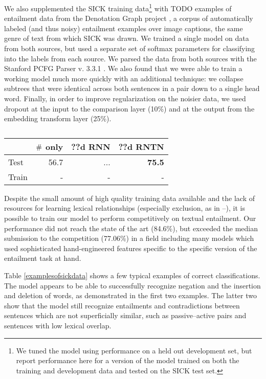 We also supplemented the SICK training data\footnote{We tuned the model using performance on a held out development set, but report performance here for a version of the model trained on both the training and development data and tested on the SICK test set.} with TODO examples of entailment data from the Denotation Graph project \cite{hodoshimage}, a corpus of automatically labeled (and thus noisy) entailment examples over image captions, the same genre of text from which SICK was drawn. We trained a single model on data from both sources, but used a separate set of softmax parameters for classifying into the labels from each source. We parsed the data from both sources with the Stanford PCFG Parser v. 3.3.1 \cite{klein2003accurate}. We also found that we were able to train a working model much more quickly with an additional technique: we collapse subtrees that were identical across both sentences in a pair down to a single head word. Finally, in order to improve regularization on the noisier data, we used dropout \cite{hinton2012improving} at the input to the comparison layer (10\%) and at the output from the embedding transform layer (25\%). 

\begin{table}[tp]
  \centering \small
  \begin{tabular}{ l r@{ \ } r@{ \ } r@{ \ } }
    \toprule
    ~&\multicolumn{1}{c}{$\mathbin{\#}$ only} & \multicolumn{1}{c}{??d RNN}  & \multicolumn{1}{c}{??d RNTN}\\
    \midrule
    Test & 56.7 &	...& \textbf{75.5} \\
    Train &- &- &-  \\
    \bottomrule
  \end{tabular}
  \caption{}
  \label{sresultstable}
\end{table} 

Despite the small amount of high quality training data available and the lack of resources for learning lexical relationships (especially exclusion, as in --), it is possible to train our model to perform competitively on textual entailment. Our performance did not reach the state of the art (84.6\%), but exceeded the median submission to the competition (77.06\%) in a field including many models which used sophisticated hand-engineered features specific to the specific version of the entailment task at hand.

Table \ref{examplesofsickdata} shows a few typical examples of correct classifications. The model appears to be able to successfully recognize negation and the insertion and deletion of words, as demonstrated in the first two examples. The latter two show that the model still recognize entailments and contradictions between sentences which are not superficially similar, such as passive--active pairs and sentences with low lexical overlap.